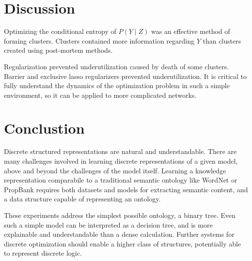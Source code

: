 \documentclass[11pt,letterpaper]{article}
\begin{document}
\section{Discussion}

Optimizing the conditional entropy of $P(Y\mid Z)$ was an effective method of forming clusters. Clusters contained more information regarding $Y$ than clusters created using post-mortem methods.

Regularization prevented underutilization caused by death of some clusters. Barrier and exclusive lasso regularizers prevented underutilization. It is critical to fully understand the dynamics of the optimization problem in such a simple environment, so it can be applied to more complicated networks.

\section{Conclustion}
Discrete structured representations are natural and understandable. There are many challenges involved in learning discrete representations of a given model, above and beyond the challenges of the model itself. Learning a knowledge representation comparabile to a traditional semantic ontology like WordNet or PropBank requires both datasets and models for extracting semantic content, and a data structure capable of representing an ontology. 

These experiments address the simplest possible ontology, a binary tree. Even such a simple model can be interpreted as a decision tree, and is more explainable and understandable than a dense calculation. Further systems for discrete optimization should enable a higher class of structures, potentially able to represent discrete logic.



\end{document}
